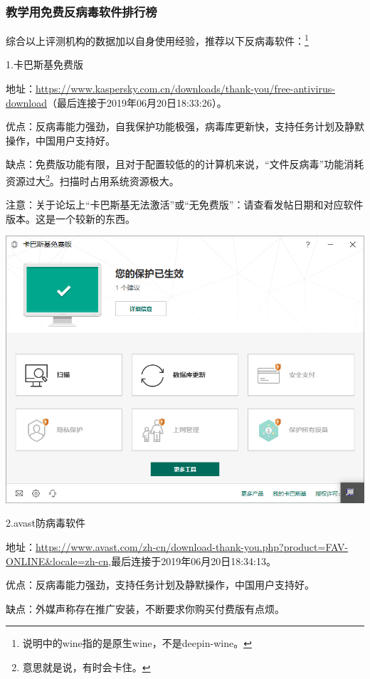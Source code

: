 \subsubsection{教学用免费反病毒软件排行榜}
综合以上评测机构的数据加以自身使用经验，推荐以下反病毒软件：\footnote{说明中的wine指的是原生wine，不是deepin-wine。}\par
1.卡巴斯基免费版\par
地址：\url{https://www.kaspersky.com.cn/downloads/thank-you/free-antivirus-download}（最后连接于2019年06月20日18:33:26）。\par
优点：反病毒能力强劲，自我保护功能极强，病毒库更新快，支持任务计划及静默操作，中国用户支持好。\par
缺点：免费版功能有限，且对于配置较低的的计算机来说，“文件反病毒”功能消耗资源过大\footnote{意思就是说，有时会卡住。}。扫描时占用系统资源极大。\par
注意：关于论坛上“卡巴斯基无法激活”或“无免费版”：请查看发帖日期和对应软件版本。这是一个较新的东西。
\begin{center}
	\includegraphics[scale=0.6]{pic/kfa}
\end{center} \par
2.avast防病毒软件\par
地址：\url{https://www.avast.com/zh-cn/download-thank-you.php?product=FAV-ONLINE\&locale=zh-cn},最后连接于2019年06月20日18:34:13。\par
优点：反病毒能力强劲，支持任务计划及静默操作，中国用户支持好。\par
缺点：外媒声称存在推广安装，不断要求你购买付费版有点烦。
